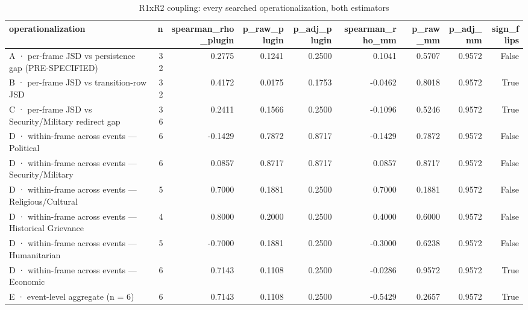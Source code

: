 \begin{table}
\caption{R1xR2 coupling: every searched operationalization, both estimators}
\label{tab:r1r2_coupling_contrast}
\begin{tabular}{lrrrrrrrr}
\toprule
operationalization & n & spearman\_rho\_plugin & p\_raw\_plugin & p\_adj\_plugin & spearman\_rho\_mm & p\_raw\_mm & p\_adj\_mm & sign\_flips \\
\midrule
A · per-frame JSD vs persistence gap (PRE-SPECIFIED) & 32 & 0.2775 & 0.1241 & 0.2500 & 0.1041 & 0.5707 & 0.9572 & False \\
B · per-frame JSD vs transition-row JSD & 32 & 0.4172 & 0.0175 & 0.1753 & -0.0462 & 0.8018 & 0.9572 & True \\
C · per-frame JSD vs Security/Military redirect gap & 36 & 0.2411 & 0.1566 & 0.2500 & -0.1096 & 0.5246 & 0.9572 & True \\
D · within-frame across events — Political & 6 & -0.1429 & 0.7872 & 0.8717 & -0.1429 & 0.7872 & 0.9572 & False \\
D · within-frame across events — Security/Military & 6 & 0.0857 & 0.8717 & 0.8717 & 0.0857 & 0.8717 & 0.9572 & False \\
D · within-frame across events — Religious/Cultural & 5 & 0.7000 & 0.1881 & 0.2500 & 0.7000 & 0.1881 & 0.9572 & False \\
D · within-frame across events — Historical Grievance & 4 & 0.8000 & 0.2000 & 0.2500 & 0.4000 & 0.6000 & 0.9572 & False \\
D · within-frame across events — Humanitarian & 5 & -0.7000 & 0.1881 & 0.2500 & -0.3000 & 0.6238 & 0.9572 & False \\
D · within-frame across events — Economic & 6 & 0.7143 & 0.1108 & 0.2500 & -0.0286 & 0.9572 & 0.9572 & True \\
E · event-level aggregate (n = 6) & 6 & 0.7143 & 0.1108 & 0.2500 & -0.5429 & 0.2657 & 0.9572 & True \\
\bottomrule
\end{tabular}
\end{table}
